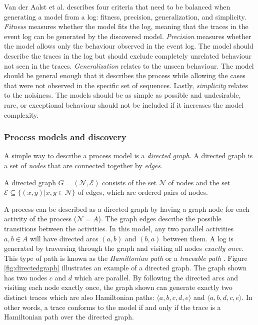 Van der Aalst et al. \cite{van2013discovering} describes four criteria that need to be balanced when generating a model from a log: fitness, precision, generalization, and simplicity.
\emph{Fitness} measures whether the model fits the log, meaning that the traces in the event log can be generated by the discovered model.
\emph{Precision} measures whether the model allows only the behaviour observed in the event log. The model should describe the traces in the log but should exclude completely unrelated behaviour not seen in the traces.
\emph{Generalization} relates to the unseen behaviour. The model should be general enough that it describes the process while allowing the cases that were not observed in the specific set of sequences.
Lastly, \emph{simplicity} relates to the noisiness. The models should be as simple as possible and undesirable, rare, or exceptional behaviour should not be included if it increases the model complexity.


\subsubsection{Process models and discovery}
\label{sec:processmodelsdsc}

A simple way to describe a process model is a \emph{directed graph}. A directed graph is a set of \emph{nodes} that are connected together by \emph{edges}. 

\begin{definition}
A directed graph $G = (\mathcal{N}, \mathcal{E})$ consists of the set $\mathcal{N}$ of nodes and the set $\mathcal{E} \subseteq \{ (x,y) | x,y \in \mathcal{N} \} $ of edges, which are ordered pairs of nodes.
\end{definition}

A process can be described as a directed graph by having a graph node for each activity of the process ($\mathcal{N} = A$). The graph edges describe the possible transitions between the activities.
In this model, any two parallel activities $a, b \in A$ will have directed arcs $(a,b)$ and $(b,a)$ between them.
A log is generated by traversing through the graph and visiting all nodes \textit{exactly once}.
This type of path is known as the \textit{Hamiltonian path} or a \textit{traceable path} \cite{garey1979computers}.
Figure \ref{fig:directedgraph} illustrates an example of a directed graph.
The graph shown has two nodes $c$ and $d$ which are parallel.
By following the directed arcs and visiting each node exactly once, the graph shown can generate exactly two distinct traces which are also Hamiltonian paths: $\langle a,b,c,d,e \rangle$ and $\langle a,b,d,c,e \rangle$.
In other words, a trace conforms to the model if and only if the trace is a Hamiltonian path over the directed graph.

